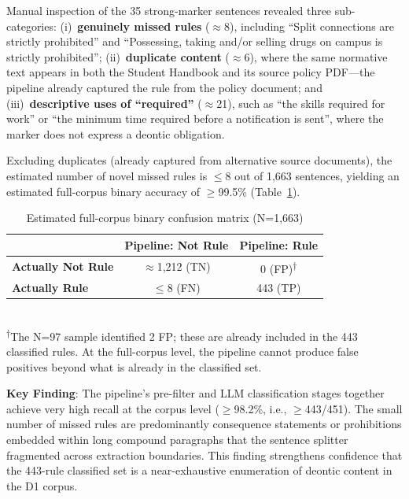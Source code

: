 Manual inspection of the 35 strong-marker sentences revealed three sub-categories: (i)~\textbf{genuinely missed rules} ($\approx$8), including ``Split connections are strictly prohibited'' and ``Possessing, taking and/or selling drugs on campus is strictly prohibited''; (ii)~\textbf{duplicate content} ($\approx$6), where the same normative text appears in both the Student Handbook and its source policy PDF---the pipeline already captured the rule from the policy document; and (iii)~\textbf{descriptive uses of ``required''} ($\approx$21), such as ``the skills required for work'' or ``the minimum time required before a notification is sent'', where the marker does not express a deontic obligation.

Excluding duplicates (already captured from alternative source documents), the estimated number of novel missed rules is $\leq$8 out of 1,663 sentences, yielding an estimated full-corpus binary accuracy of $\geq$99.5\% (Table~\ref{tab:full-corpus-binary-matrix}).

\begin{table}[h]
\centering
\caption{Estimated full-corpus binary confusion matrix (N=1,663)}
\label{tab:full-corpus-binary-matrix}
\begin{tabular}{lcc}
\toprule
 & \textbf{Pipeline: Not Rule} & \textbf{Pipeline: Rule} \\
\midrule
\textbf{Actually Not Rule} & $\approx$1,212 (TN) & 0 (FP)\textsuperscript{$\dagger$} \\
\textbf{Actually Rule} & $\leq$8 (FN) & 443 (TP) \\
\bottomrule
\end{tabular}
\\[4pt]
\footnotesize\textsuperscript{$\dagger$}The N=97 sample identified 2 FP; these are already included in the 443 classified rules. At the full-corpus level, the pipeline cannot produce false positives beyond what is already in the classified set.
\end{table}

\textbf{Key Finding}: The pipeline's pre-filter and LLM classification stages together achieve very high recall at the corpus level ($\geq$98.2\%, i.e., $\geq$443/451). The small number of missed rules are predominantly consequence statements or prohibitions embedded within long compound paragraphs that the sentence splitter fragmented across extraction boundaries. This finding strengthens confidence that the 443-rule classified set is a near-exhaustive enumeration of deontic content in the D1 corpus.

